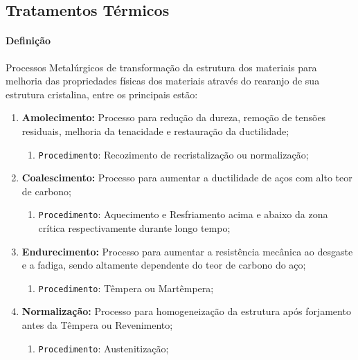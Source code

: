 \documentclass{article}
\begin{document}
        \subsection{Tratamentos Térmicos}
            \paragraph{Definição}Processos Metalúrgicos de transformação da estrutura dos materiais para melhoria das propriedades físicas dos materiais através do rearanjo de sua estrutura cristalina, entre os principais estão:
                \begin{enumerate}[rightmargin = \leftmargin, noitemsep]
                    \item \textbf{Amolecimento:} Processo para redução da dureza, remoção de tensões residuais, melhoria da tenacidade e restauração da ductilidade;
                        \begin{enumerate}[rightmargin = \leftmargin, noitemsep]
                            \item \texttt{Procedimento}: Recozimento de recristalização ou normalização;
                        \end{enumerate}

                    \item \textbf{Coalescimento:} Processo para aumentar a ductilidade de aços com alto teor de carbono;
                        \begin{enumerate}[rightmargin = \leftmargin, noitemsep]
                            \item \texttt{Procedimento}: Aquecimento e Resfriamento acima e abaixo da zona crítica respectivamente durante longo tempo;
                        \end{enumerate}

                    \item \textbf{Endurecimento:} Processo para aumentar a resistência mecânica ao desgaste e a fadiga, sendo altamente dependente do teor de carbono do aço;
                        \begin{enumerate}[rightmargin = \leftmargin, noitemsep]
                            \item \texttt{Procedimento}: Têmpera ou Martêmpera;
                        \end{enumerate}

                    \item \textbf{Normalização:} Processo para homogeneização da estrutura após forjamento antes da Têmpera ou Revenimento;
                        \begin{enumerate}[rightmargin = \leftmargin, noitemsep]
                            \item \texttt{Procedimento}: Austenitização;
                        \end{enumerate}


\end{enumerate}
\end{document}
